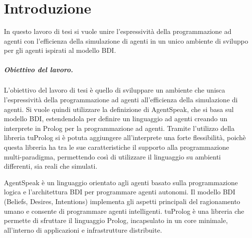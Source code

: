 \chapter{Introduzione}
\lhead[\fancyplain{}{\bfseries\thepage}]{\fancyplain{}{\bfseries\rightmark}}
In questo lavoro di tesi si vuole unire l'espressività della programmazione ad agenti con l'efficienza della simulazione di agenti in un unico ambiente di sviluppo per gli agenti ispirati al modello BDI.


\paragraph{Obiettivo del lavoro.}

L'obiettivo del lavoro di tesi è quello di sviluppare un ambiente che unisca l'espressività della programmazione ad agenti all'efficienza della simulazione di agenti.
Si vuole quindi utilizzare la definizione di AgentSpeak, che si basa sul modello BDI, estendendola per definire un linguaggio ad agenti creando un interprete in Prolog per la programmazione ad agenti.
Tramite l'utilizzo della libreria tuProlog si è potuta aggiungere all'interprete una forte flessibilità, poichè questa libreria ha tra le sue caratteristiche il supporto alla programmazione multi-paradigma, permettendo così di utilizzare il linguaggio su ambienti differenti, sia reali che simulati.


AgentSpeak è un linguaggio orientato agli agenti basato sulla programmazione logica e l'architettura BDI per programmare agenti autonomi. Il modello BDI (Beliefs, Desires, Intentions) implementa gli aspetti principali del ragionamento umano e consente di programmare agenti intelligenti.
tuProlog è una libreria che permette di sfruttare il linguaggio Prolog, incapsulato in un core minimale, all'interno di applicazioni e infrastrutture distribuite.

